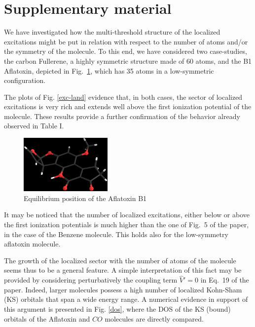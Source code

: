 \documentclass[11pt,a4paper]{article}
\newcommand{\op}[1]{\hat {#1}}
\begin{document}


\section*{Supplementary material}

We have investigated how the multi-threshold structure of the localized excitations might be put in relation with respect to
the number of atoms and/or the symmetry of the molecule. To this end, we have considered two case-studies, the carbon Fullerene, a highly symmetric structure made of 60 atoms, and the B1 Aflatoxin, depicted in Fig.~\ref{aflab1}, which has 35 atoms in a low-symmetric configuration.

The plots of Fig. \ref{exc-land} evidence that, in both cases, the sector of localized excitations is very rich and extends well above the first ionization potential of the molecule. These results provide a further confirmation of the behavior already observed in Table I.
\begin{figure}[h]
  \centering
  \includegraphics[width=0.4\textwidth]{AflaB1.eps}
    \caption{Equilibrium position of the Aflatoxin B1}
\label{aflab1}
\end{figure}

It may be noticed that the number of localized excitations, either below or above the first ionization potentials is much higher than
the one of Fig.~5 of the paper, in the case of the Benzene molecule. This holds also for the low-symmetry aflatoxin molecule.

The growth of the localized sector with the number of atoms of the molecule seems thus to be a general feature.
A simple interpretation of this fact may be provided by considering perturbatively the coupling term $\op V'=0$ in Eq.~19 of the paper.
Indeed, larger molecules possess a high number of localized Kohn-Sham (KS) orbitals that span a wide energy range.
A numerical evidence in support of this argument is presented in Fig. \ref{dos}, where the DOS of the KS (bound) orbitals of the Aflatoxin and $CO$ molecules are directly compared.
\end{document}
